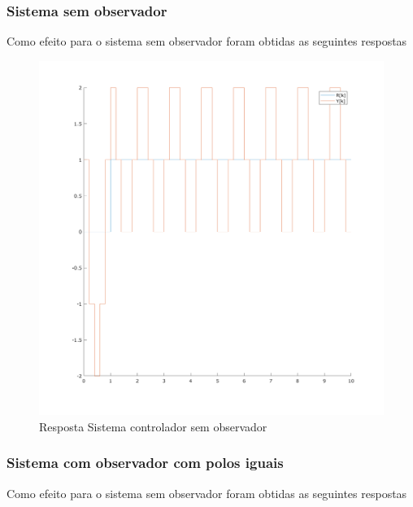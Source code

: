 \documentclass[a4paper,11pt]{article}
\begin{document}
\subsubsection{Sistema sem observador}

Como efeito para o sistema sem observador foram obtidas as seguintes respostas

\begin{figure}[H]
    \centering
    \includegraphics[width=0.9\linewidth]{img/exsim6-ss-sim.png}
    \caption{Resposta Sistema controlador sem observador}
\end{figure}

\subsubsection{Sistema com observador com polos iguais}

Como efeito para o sistema sem observador foram obtidas as seguintes respostas
\end{document}

